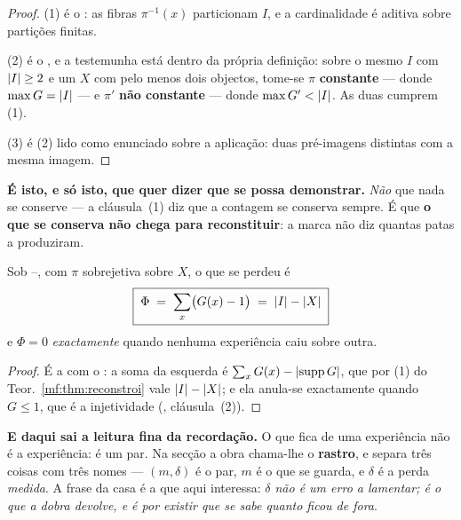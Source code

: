 \documentclass[../livro.tex]{subfiles}
\begin{document}
\begin{proof}
(1) é o : as fibras $\pi^{-1}(x)$
particionam $I$, e a cardinalidade é aditiva sobre partições finitas.

(2) é o , e a
testemunha está dentro da própria definição: sobre o mesmo $I$ com
$\lvert I\rvert\ge2$ e um $X$ com pelo menos dois objectos, tome-se $\pi$
\textbf{constante} --- donde $\max G=\lvert I\rvert$ --- e $\pi'$ \textbf{não
constante} --- donde $\max G'<\lvert I\rvert$. As duas cumprem (1).

(3) é (2) lido como enunciado sobre a aplicação: duas pré-imagens distintas com a
mesma imagem.
\end{proof}

\medskip\noindent\textbf{É isto, e só isto, que 
quer dizer que se possa demonstrar.} \emph{Não} que nada se conserve --- a
cláusula~(1) diz que a contagem se conserva sempre. É que \textbf{o que se
conserva não chega para reconstituir}: a marca não diz quantas patas a
produziram.

\begin{corolario}\label{mf:cor:debito}
Sob --, com $\pi$ sobrejetiva sobre $X$, o que se perdeu é
\[
\boxed{\;\Phi\;=\;\sum_{x}\bigl(G(x)-1\bigr)\;=\;\lvert I\rvert-\lvert X\rvert\;}
\]
e $\Phi=0$ \emph{exactamente} quando nenhuma experiência caiu sobre outra.
\end{corolario}

\begin{proof}
É a  com o
: a soma da esquerda é
$\sum_xG(x)-\lvert \operatorname{supp}G\rvert$, que por (1) do
Teor.~\ref{mf:thm:reconstroi} vale $\lvert I\rvert-\lvert X\rvert$; e ela anula-se exactamente
quando $G\le1$, que é a injetividade
(, cláusula~(2)).
\end{proof}

\medskip\noindent\textbf{E daqui sai a leitura fina da recordação.} O que fica de
uma experiência não é a experiência: é um par. Na secção
 a obra chama-lhe o \textbf{rastro}, e separa três coisas com
três nomes ---
$(m,\delta)$ é o par, $m$ é o que se guarda, e $\delta$ é a perda \emph{medida}.
A frase da casa é a que aqui interessa: \emph{$\delta$ não é um erro a lamentar;
é o que a dobra devolve, e é por existir que se sabe quanto ficou de fora}.
\end{document}
